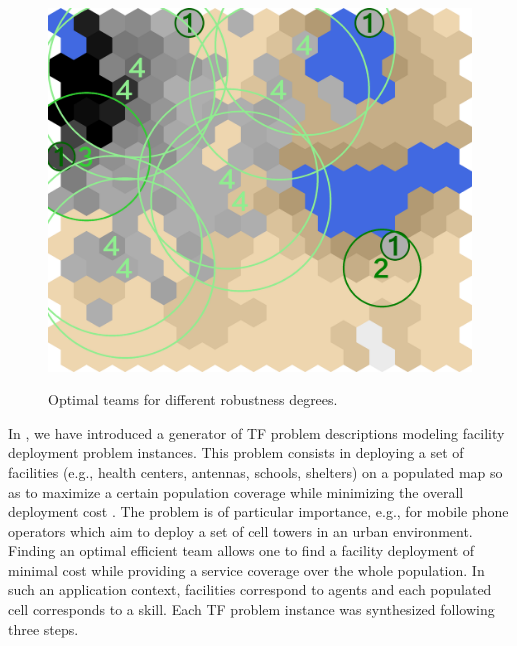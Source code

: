\documentclass[conference]{IEEEtran}
\theoremstyle{definition}
\begin{document}
\begin{figure}[tp]
{		\label{subfig:map-solutionKTF}
		\includegraphics[width=\widthmap\textwidth]{TF-1-KTF-k1}
	}
	\caption{Optimal teams for different robustness degrees.}
	\label{fig:map-solution}
\end{figure}

In \cite{schwind2021}, we have introduced
a generator of TF problem descriptions
modeling facility deployment problem instances.
This problem consists in deploying a set of facilities 
(e.g., health centers, antennas, schools, shelters) on a populated map
so as to maximize a certain population coverage while minimizing the overall deployment cost \cite{fac}.
The problem is of particular importance, e.g., for mobile phone operators
which aim to deploy a set of cell towers in an urban environment.
Finding an optimal efficient team allows one to find a facility deployment
of minimal cost while providing a service coverage over
the whole population. In such an application context, facilities correspond to agents
and each populated cell corresponds to a skill.
Each TF problem instance was synthesized following three steps.
\end{document}
